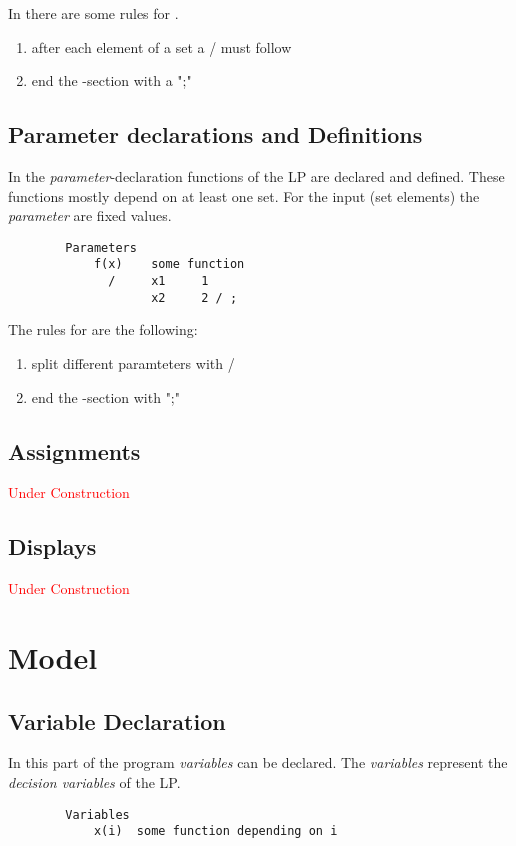 \documentclass[10pt]{article}
\begin{document}
      In  there are some rules for .
      \begin{enumerate}
        \item after each element of a set a / must follow
        \item end the -section with a ";"
      \end{enumerate}

      

    \subsection{Parameter declarations and Definitions}
    \label{data:ParaDeclaNDef}
      In the \emph{parameter}-declaration functions of the LP are declared and
      defined. These functions mostly depend on at least one set. For the input
      (set elements) the \emph{parameter} are fixed values.

      \begin{lstlisting}
        Parameters
            f(x)    some function
              /     x1     1
                    x2     2 / ;
      \end{lstlisting}
      The rules for  are the following:
      \begin{enumerate}
        \item split different paramteters with /
        \item end the -section with ";"
      \end{enumerate}

    \subsection{Assignments}
    \label{data:assingments}
      \textcolor{red}{Under Construction}

    \subsection{Displays}
    \label{data:displays}
      \textcolor{red}{Under Construction}
    
  \section{Model}
  \label{model}
    \subsection{Variable Declaration}
    \label{model:VarDec}
    In this part of the program \emph{variables} can be declared. The
    \emph{variables} represent the \emph{decision variables} of the LP.
      \begin{lstlisting}
        Variables
            x(i)  some function depending on i
      \end{lstlisting}
\end{document}
